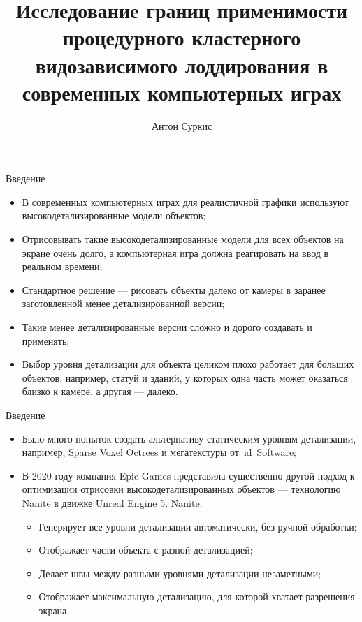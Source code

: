 \documentclass{beamer}
\title{Исследование границ применимости процедурного кластерного видозависимого лоддирования в современных компьютерных играх}
\author{Антон Суркис}
\begin{document}
    \maketitle

    \begin{frame}{Введение}
        \begin{itemize}
            \item
            В современных компьютерных играх для реалистичной графики
            используют высокодетализированные модели объектов;

            \item
            Отрисовывать такие высокодетализированные модели для
            всех объектов на экране очень долго,
            а компьютерная игра должна реагировать на ввод
            в реальном времени;

            \item
            Стандартное решение --- рисовать объекты
            далеко от камеры в заранее заготовленной
            менее детализированной версии;

            \item
            Такие менее детализированные версии
            сложно и дорого создавать и применять;

            \item
            Выбор уровня детализации для объекта целиком
            плохо работает для больших объектов,
            например, статуй и зданий,
            у которых одна часть может оказаться близко
            к камере, а другая --- далеко.
        \end{itemize}
    \end{frame}

    \begin{frame}{Введение}
        \begin{itemize}
            \item Было много попыток создать альтернативу
            статическим уровням детализации, например,
            Sparse Voxel Octrees и мегатекстуры
            от~id~Software;

            \item В 2020 году компания Epic Games представила
            существенно другой подход к оптимизации
            отрисовки высокодетализированных объектов
            --- технологию Nanite в движке Unreal Engine 5.
            Nanite:
            \begin{itemize}
                \item Генерирует все уровни детализации автоматически,
                без ручной обработки;
                \item Отображает части объекта с разной детализацией;
                \item Делает швы между разными уровнями детализации незаметными;
                \item Отображает максимальную детализацию,
                для которой хватает разрешения экрана.
            \end{itemize}
        \end{itemize}
    \end{frame}
\end{document}
